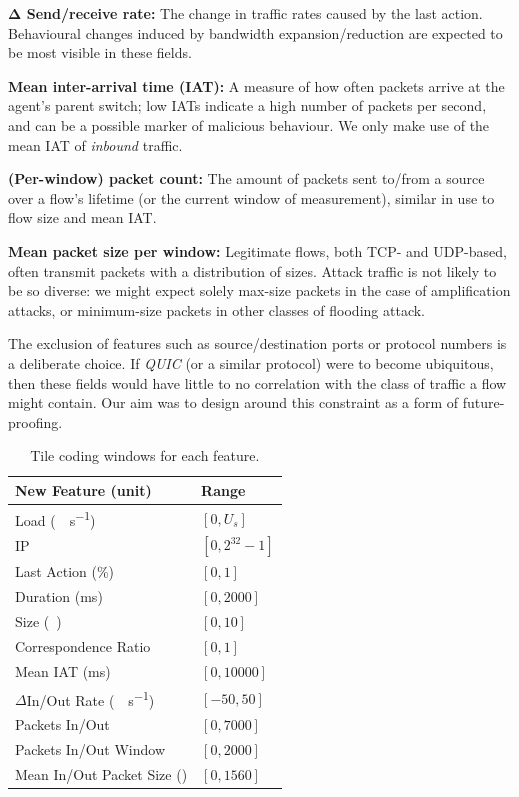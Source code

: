 \documentclass[10pt, times, conference, letterpaper]{IEEEtran}
\newcommand{\fakepara}[1]{\noindent\textbf{#1:}}
\begin{document}
\fakepara{$\mathbf{\Delta}$ Send/receive rate}
The change in traffic rates caused by the last action.
Behavioural changes induced by bandwidth expansion/reduction are expected to be most visible in these fields.

\fakepara{Mean inter-arrival time (IAT)}
A measure of how often packets arrive at the agent's parent switch; low IATs indicate a high number of packets per second, and can be a possible marker of malicious behaviour.
We only make use of the mean IAT of \emph{inbound} traffic.

\fakepara{(Per-window) packet count}
The amount of packets sent to/from a source over a flow's lifetime (or the current window of measurement), similar in use to flow size and mean IAT.

\fakepara{Mean packet size per window}
Legitimate flows, both TCP- and UDP-based, often transmit packets with a distribution of sizes.
Attack traffic is not likely to be so diverse: we might expect solely max-size packets in the case of amplification attacks, or minimum-size packets in other classes of flooding attack.

The exclusion of features such as source/destination ports or protocol numbers is a deliberate choice.
If \emph{QUIC} (or a similar protocol) were to become ubiquitous, then these fields would have little to no correlation with the class of traffic a flow might contain.
Our aim was to design around this constraint as a form of future-proofing.

\begin{table}
	\centering
	\caption{Tile coding windows for each feature.\label{tab:codings}}
	
	\begin{tabular}{@{}ll@{}}
		\toprule
		New Feature (unit) & Range \\
		\midrule
		Load (\si{\mega\bit\per\second}) & $[0, U_s]$ \\
		IP & $[0, 2^{32}-1]$ \\
		Last Action (\si{\percent}) & $[0, 1]$ \\
		Duration (\si{\milli\second}) & $[0, \num{2000}]$ \\
		Size (\si{\mebi\byte}) & $[0,10]$ \\
		Correspondence Ratio & $[0,1]$ \\
		Mean IAT (\si{\milli\second}) & $[0, \num{10000}]$ \\
		$\Delta$In/Out Rate (\si{\mega\bit\per\second}) & $[-50, 50]$ \\
		Packets In/Out & $[0, 7000]$ \\
		Packets In/Out Window & $[0, 2000]$ \\
		Mean In/Out Packet Size (\si{\byte}) & $[0, 1560]$ \\
		\bottomrule
	\end{tabular}
\end{table}
\end{document}
